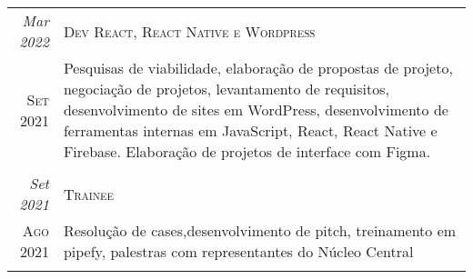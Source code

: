 \begin{framed}
\begin{tabular}{r|p{6cm}}
\emph{Mar 2022}   & \textsc{Dev React, React Native e Wordpress }   \\
\textsc{Set 2021} & \footnotesize{Pesquisas de viabilidade, elaboração de propostas de projeto, negociação de projetos, levantamento de requisitos, desenvolvimento de sites em WordPress, desenvolvimento de ferramentas internas em JavaScript, React, React Native e Firebase. Elaboração de projetos de interface com Figma.} \\
\multicolumn{2}{c}{} \\

\emph{Set 2021}   & \textsc{Trainee} \\
\textsc{Ago 2021} & \footnotesize{Resolução de cases,desenvolvimento de pitch, treinamento em pipefy, palestras com representantes do Núcleo Central}\\
\multicolumn{2}{c}{} \\
\end{tabular}

\end{framed}


